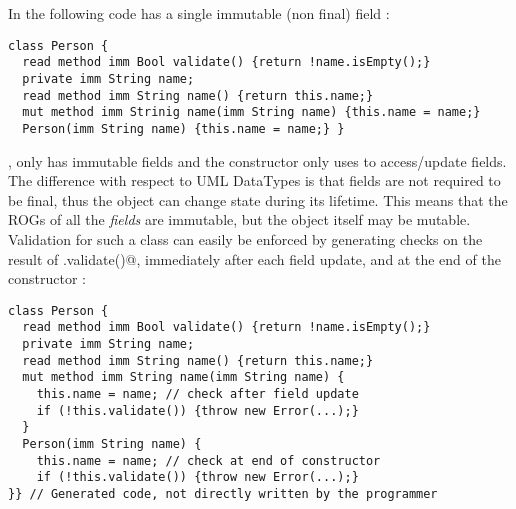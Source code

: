 In the following code \Q@Person@ has a single immutable (non final) field \Q@name@:
\begin{lstlisting}
class Person {
  read method imm Bool validate() {return !name.isEmpty();}
  private imm String name;
  read method imm String name() {return this.name;}
  mut method imm Strinig name(imm String name) {this.name = name;}
  Person(imm String name) {this.name = name;} }
\end{lstlisting}
\Q@Person@, only has immutable fields and the constructor only uses \Q@this@ to access/update fields.%
The difference with respect to UML DataTypes 
 is that fields are not required to be final, thus the object can change state during its lifetime. This means that the ROGs of all the \emph{fields} are immutable, but the object itself may be mutable.
Validation for such a class can easily be enforced by generating checks on the result of \Q@.validate()@, immediately after each field update, and at the end of the constructor%
:

\begin{lstlisting}
class Person {
  read method imm Bool validate() {return !name.isEmpty();}
  private imm String name;
  read method imm String name() {return this.name;}
  mut method imm String name(imm String name) {
    this.name = name; // check after field update
    if (!this.validate()) {throw new Error(...);} 
  }
  Person(imm String name) {
    this.name = name; // check at end of constructor
    if (!this.validate()) {throw new Error(...);}
}} // Generated code, not directly written by the programmer
\end{lstlisting}

